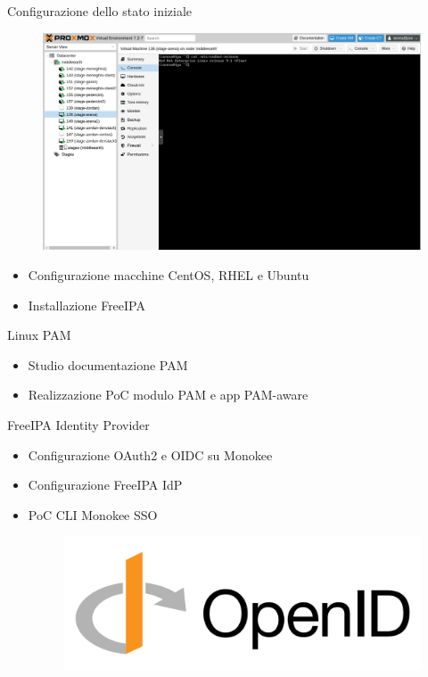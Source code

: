 \documentclass{beamer}
\begin{document}
	\begin{frame}{Configurazione dello stato iniziale}
		\begin{figure}[H] 
			\centering 
			\includegraphics[width=0.6\columnwidth]{immagini/proxmox.png} 
			\label{fig:proxmox}
		\end{figure}
		
		\begin{itemize}
			\item Configurazione macchine CentOS, RHEL e Ubuntu \vspace{.5em}
			\item Installazione FreeIPA \vspace{.5em}
		\end{itemize}
		
	\end{frame}
	
	\begin{frame}{Linux PAM}
				
		\begin{itemize}
			\item Studio documentazione PAM \vspace{.5em}
			\item Realizzazione PoC modulo PAM e app PAM-aware \vspace{.5em}
		\end{itemize}
		
	\end{frame}
	
	\begin{frame}{FreeIPA Identity Provider}
		
		\begin{itemize}
			\item Configurazione OAuth2 e OIDC su Monokee \vspace{.5em}
			\item Configurazione FreeIPA IdP \vspace{.5em}
			\item PoC CLI Monokee SSO \vspace{.5em}
			
			\begin{figure}[H] 
				\centering 
				\includegraphics[width=0.5\columnwidth]{immagini/oidc_logo.png} 
				\label{fig:oidc-setup}
			\end{figure}
		\end{itemize}
	\end{frame}
	
\end{document}
